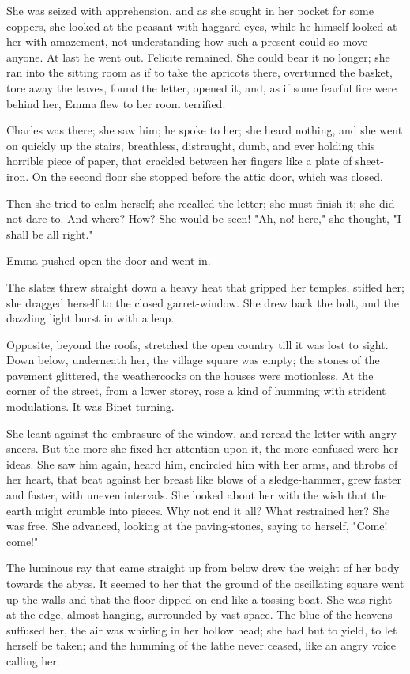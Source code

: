\documentclass[11pt,twocolumn]{ltugboat}
\begin{document}
She was seized with apprehension, and as she sought in her pocket for
some coppers, she looked at the peasant with haggard eyes, while he
himself looked at her with amazement, not understanding how such a
present could so move anyone. At last he went out. Felicite remained.
She could bear it no longer; she ran into the sitting room as if to take
the apricots there, overturned the basket, tore away the leaves, found
the letter, opened it, and, as if some fearful fire were behind her,
Emma flew to her room terrified.

Charles was there; she saw him; he spoke to her; she heard nothing, and
she went on quickly up the stairs, breathless, distraught, dumb, and
ever holding this horrible piece of paper, that crackled between her
fingers like a plate of sheet-iron. On the second floor she stopped
before the attic door, which was closed.

Then she tried to calm herself; she recalled the letter; she must finish
it; she did not dare to. And where? How? She would be seen! "Ah, no!
here," she thought, "I shall be all right."

Emma pushed open the door and went in.

The slates threw straight down a heavy heat that gripped her temples,
stifled her; she dragged herself to the closed garret-window. She drew
back the bolt, and the dazzling light burst in with a leap.

Opposite, beyond the roofs, stretched the open country till it was lost
to sight. Down below, underneath her, the village square was empty; the
stones of the pavement glittered, the weathercocks on the houses were
motionless. At the corner of the street, from a lower storey, rose a
kind of humming with strident modulations. It was Binet turning.

She leant against the embrasure of the window, and reread the letter
with angry sneers. But the more she fixed her attention upon it, the
more confused were her ideas. She saw him again, heard him, encircled
him with her arms, and throbs of her heart, that beat against her breast
like blows of a sledge-hammer, grew faster and faster, with uneven
intervals. She looked about her with the wish that the earth might
crumble into pieces. Why not end it all? What restrained her? She was
free. She advanced, looking at the paving-stones, saying to herself,
"Come! come!"

The luminous ray that came straight up from below drew the weight of
her body towards the abyss. It seemed to her that the ground of the
oscillating square went up the walls and that the floor dipped on
end like a tossing boat. She was right at the edge, almost hanging,
surrounded by vast space. The blue of the heavens suffused her, the air
was whirling in her hollow head; she had but to yield, to let herself
be taken; and the humming of the lathe never ceased, like an angry voice
calling her.
\end{document}
